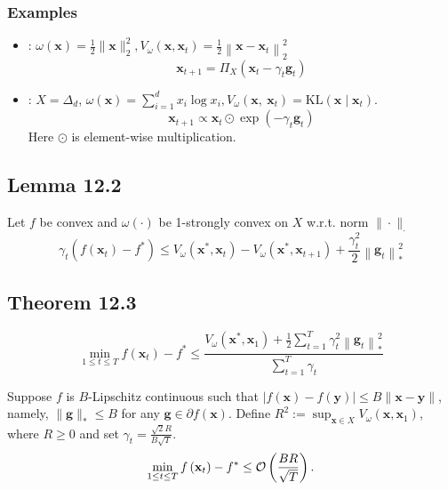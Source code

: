\subsubsection*{Examples}
\begin{itemize}[leftmargin=*]
    \item {}: $\omega(\mathbf{x})=\frac{1}{2}\|\mathbf{x}\|_{2}^{2}, V_{\omega}\left(\mathbf{x}, \mathbf{x}_{t}\right)=\frac{1}{2}\left\|\mathbf{x}-\mathbf{x}_{t}\right\|_{2}^{2}$
$$
\mathbf{x}_{t+1}=\Pi_{X}\left(\mathbf{x}_{t}-\gamma_{t} \mathbf{g}_{t}\right)
$$
    \item {}: $X=\Delta_{d}$, $\omega(\mathbf{x})=\sum_{i=1}^{d} x_{i} \log x_{i}, V_{\omega}\left(\mathbf{x},\ \mathbf{x}_{t}\right)=\mathrm{KL}\left(\mathbf{x} \mid \mathbf{x}_{t}\right)$.
$$
\mathbf{x}_{t+1} \propto \mathbf{x}_{t} \odot \exp \left(-\gamma_{t} \mathbf{g}_{t}\right)
$$
Here $\odot$ is element-wise multiplication.
\end{itemize}







\subsection*{Lemma 12.2}
Let $f$ be convex and $\omega(\cdot)$ be 1-strongly convex on $X$ w.r.t. norm $\|\cdot\|_{\cdot}$
$$\gamma_{t}\left(f\left(\mathbf{x}_{t}\right)-f^{*}\right) \leq V_{\omega}\left(\mathbf{x}^{*}, \mathbf{x}_{t}\right)-V_{\omega}\left(\mathbf{x}^{*}, \mathbf{x}_{t+1}\right)+\frac{\gamma_{t}^{2}}{2}\left\|\mathbf{g}_{t}\right\|_{*}^{2}$$


\subsection*{Theorem 12.3}
$$
\min _{1 \leq t \leq T} f\left(\mathbf{x}_{t}\right)-f^{*} \leq \frac{V_{\omega}\left(\mathbf{x}^{*}, \mathbf{x}_{1}\right)+\frac{1}{2} \sum_{t=1}^{T} \gamma_{t}^{2}\left\|\mathbf{g}_{t}\right\|_{*}^{2}}{\sum_{t=1}^{T} \gamma_{t}}
$$

Suppose $f$ is $B$-Lipschitz continuous such that $|f(\mathbf{x})-f(\mathbf{y})| \leq B\|\mathbf{x}-\mathbf{y}\|$, namely, $\|\mathbf{g}\|_{*} \leq B$ for any $\mathbf{g} \in \partial f(\mathbf{x})$. Define $R^{2}:=\sup _{\mathbf{x} \in X} V_{\omega}\left(\mathbf{x}, \mathbf{x}_{1}\right)$, where $R \geq 0$ and set $\gamma_{t}=\frac{\sqrt{2} R}{B \sqrt{T}}$.
$$
\min _{1 \leq t \leq T} f\left(\mathbf{x}_{t}\right)-f^{*} \leq \operatorname{\mathcal{O}}\left(\frac{B R}{\sqrt{T}}\right) .
$$



